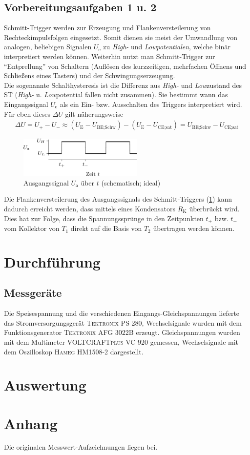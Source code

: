 \documentclass[numbers=noenddot,10pt,a4paper]{scrartcl}
\newcommand{\ix}[1]{_\text{#1}}
\begin{document}
\subsection{Vorbereitungsaufgaben 1 u. 2}
Schmitt-Trigger werden zur Erzeugung und Flankenversteilerung von Rechteckimpulsfolgen eingesetzt. Somit dienen sie meist der Umwandlung von analogen, beliebigen Signalen $U\ix{e}$ zu \textit{High-} und \textit{Lowpotentialen}, welche binär interpretiert werden können. Weiterhin nutzt man Schmitt-Trigger zur "`Entprellung"' von Schaltern (Auflösen des kurzzeitigen, mehrfachen Öffnens und Schließens eines Tasters) und der Schwingungserzeugung. \\
Die sogenannte Schalthysteresis ist die Differenz aus \textit{High-} und \textit{Low}zustand des ST (\textit{High-} u. \textit{Low}potential fallen nicht zusammen). Sie bestimmt wann das Eingangssignal $U\ix{e}$ als ein Ein- bzw. Ausschalten des Triggers interpretiert wird. Für eben dieses $\Delta U$ gilt näherungsweise
\begin{align}
\Delta U=U_+-U_-\approx\left(U\ix{E}-U\ix{BE;Schw}\right)-\left(U\ix{E}-U\ix{CE;sat}\right)=U\ix{BE;Schw}-U\ix{CE;sat}
\end{align}
\begin{figure}[H]
\centering
\includegraphics[width=0.55\textwidth]{ausgangssignal.png}
\caption{Ausgangssignal $U\ix{a}$ über $t$ (schematisch; ideal)}
\label{img:signal}
\end{figure}
Die Flankenversteilerung des Ausgangssignals des Schmitt-Triggers (\ref{img:signal}) kann dadurch erreicht werden, dass mittels eines Kondensators $R\ix{K}$ überbrückt wird. Dies hat zur Folge, dass die Spannungssprünge in den Zeitpunkten $t_+$ bzw. $t_-$ vom Kollektor von $T_1$ direkt auf die Basis von $T_2$ übertragen werden können.
\section{Durchführung}
\subsection{Messgeräte}
Die Speisespannung und die verschiedenen Eingangs-Gleichspannungen lieferte das Stromversorgungsgerät \textsc{Tektronix PS 280}, Wechselsignale wurden mit dem Funktionsgenerator \textsc{Tektronix AFG 3022B} erzeugt. Gleichspannungen wurden mit dem Multimeter \textsc{VOLTCRAFTplus VC 920} gemessen, Wechselsignale mit dem Oszilloskop \textsc{Hameg HM1508-2} dargestellt.
\section{Auswertung}
\section{Anhang}
Die originalen Messwert-Aufzeichnungen liegen bei.
\end{document}
